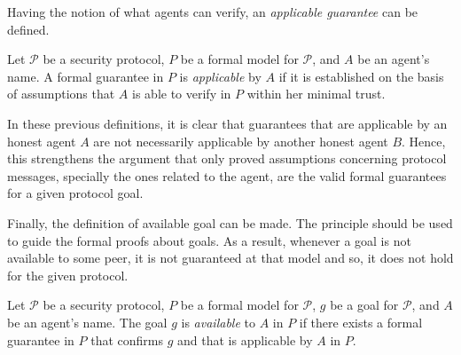 Having the notion of what agents can verify, an \textit{applicable guarantee} can be defined.

\begin{definition}
  Let \(\mathcal{P}\) be a security protocol, \(P\) be a formal model for \(\mathcal{P}\), and \(A\) be an agent's name. A formal guarantee in \(P\) is \textit{applicable} by \(A\) if it is established on the basis of assumptions that \(A\) is able to verify in \(P\) within her minimal trust.
\end{definition}

In these previous definitions, it is clear that guarantees that are applicable by an honest agent \(A\) are not necessarily applicable by another honest agent \(B\). Hence, this strengthens the argument that only proved assumptions concerning protocol messages, specially the ones related to the agent, are the valid formal guarantees for a given protocol goal.

Finally, the definition of available goal can be made. The principle should be used to guide the formal proofs about goals. As a result, whenever a goal is not available to some peer, it is not guaranteed at that model and so, it does not hold for the given protocol.

\begin{definition}
  Let \(\mathcal{P}\) be a security protocol, \(P\) be a formal model for \(\mathcal{P}\), \(g\) be a goal for \(\mathcal{P}\), and \(A\) be an agent's name. The goal \(g\) is \textit{available} to \(A\) in \(P\) if there exists a formal guarantee in \(P\) that confirms \(g\) and that is applicable by \(A\) in \(P\).
\end{definition}
